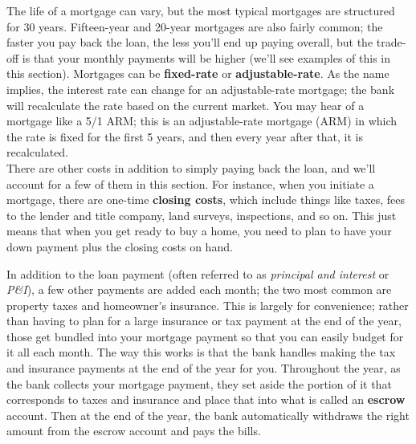 The life of a mortgage can vary, but the most typical mortgages are structured for 30 years.  Fifteen-year and 20-year mortgages are also fairly common; the faster you pay back the loan, the less you'll end up paying overall, but the trade-off is that your monthly payments will be higher (we'll see examples of this in this section).  Mortgages can be \textbf{fixed-rate} or \textbf{adjustable-rate}.  As the name implies, the interest rate can change for an adjustable-rate mortgage; the bank will recalculate the rate based on the current market.  You may hear of a mortgage like a 5/1 ARM; this is an adjustable-rate mortgage (ARM) in which the rate is fixed for the first 5 years, and then every year after that, it is recalculated.\\

There are other costs in addition to simply paying back the loan, and we'll account for a few of them in this section.  For instance, when you initiate a mortgage, there are one-time \textbf{closing costs}, which include things like taxes, fees to the lender and title company, land surveys, inspections, and so on.  This just means that when you get ready to buy a home, you need to plan to have your down payment plus the closing costs on hand.
\pagebreak

In addition to the loan payment (often referred to as \emph{principal and interest} or \emph{P\&I}), a few other payments are added each month; the two most common are property taxes and homeowner's insurance.  This is largely for convenience; rather than having to plan for a large insurance or tax payment at the end of the year, those get bundled into your mortgage payment so that you can easily budget for it all each month.  The way this works is that the bank handles making the tax and insurance payments at the end of the year for you.  Throughout the year, as the bank collects your mortgage payment, they set aside the portion of it that corresponds to taxes and insurance and place that into what is called an \textbf{escrow} account.  Then at the end of the year, the bank automatically withdraws the right amount from the escrow account and pays the bills.

